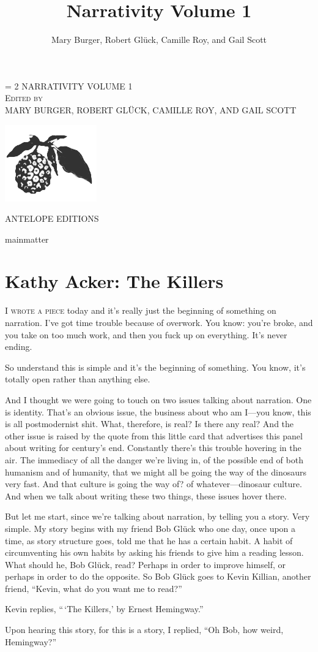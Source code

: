 \documentclass[
]{memoir}
\title{Narrativity Volume 1}
\author{Mary Burger, Robert Glück, Camille Roy, and Gail Scott}
\date{}
\newlength{\drop}%
\newcommand*{\titleWH}{\begingroup%
\drop = 2\baselineskip
\centering
\vspace*{\drop}
\settowidth{\unitlength}{\Huge\uppercase{Narrativity Volume 1}}
\vspace*{\baselineskip}
{\Huge\color{red} \uppercase{Narrativity Volume 1}}\\[\drop]
{\Large\scshape Edited by}\\[\drop]
{\Large\uppercase{Mary Burger, Robert Glück, Camille Roy, and Gail Scott}}\\[\baselineskip]
\vspace*{\drop}
\begin{center} \includegraphics{images/pandanus.png} \end{center}
\vspace*{\drop}
{\Large ANTELOPE EDITIONS}\\
{\scshape \the\year{}}\par
\vspace*{\drop}
\endgroup}
\begin{document}
\titleWH


\frontmatter


\setcounter{tocdepth}{0}
\tableofcontents



mainmatter

\hypertarget{kathy-acker-the-killers}{%
\chapter{Kathy Acker: The Killers}\label{kathy-acker-the-killers}}

\lettrine[lines=3, findent=0em, nindent=0.1em, lhang=0]{I}{ wrote a piece}
today and it's really just the beginning of something on narration. I've
got time trouble because of overwork. You know: you're broke, and you
take on too much work, and then you fuck up on everything. It's never
ending.

So understand this is simple and it's the beginning of something. You
know, it's totally open rather than anything else.

And I thought we were going to touch on two issues talking about
narration. One is identity. That's an obvious issue, the business about
who am I---you know, this is all postmodernist shit. What, therefore, is
real? Is there any real? And the other issue is raised by the quote from
this little card that advertises this panel about writing for century's
end. Constantly there's this trouble hovering in the air. The immediacy
of all the danger we're living in, of the possible end of both humanism
and of humanity, that we might all be going the way of the dinosaurs
very fast. And that culture is going the way of? of whatever---dinosaur
culture. And when we talk about writing these two things, these issues
hover there.

But let me start, since we're talking about narration, by telling you a
story. Very simple. My story begins with my friend Bob Glück who one
day, once upon a time, as story structure goes, told me that he has a
certain habit. A habit of circumventing his own habits by asking his
friends to give him a reading lesson. What should he, Bob Glück, read?
Perhaps in order to improve himself, or perhaps in order to do the
opposite. So Bob Glück goes to Kevin Killian, another friend, ``Kevin,
what do you want me to read?''

Kevin replies, ``\,`The Killers,' by Ernest Hemingway.''

Upon hearing this story, for this is a story, I replied, ``Oh Bob, how
weird, Hemingway?''
\end{document}
